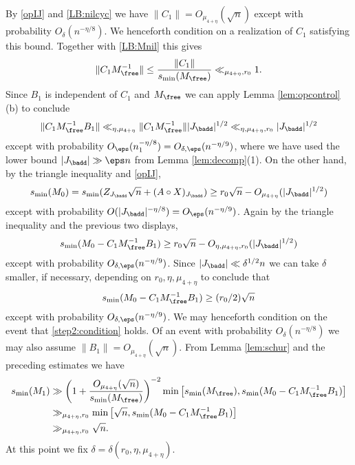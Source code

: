 \documentclass[aop,preprint]{imsart}
\theoremstyle{plain}
\theoremstyle{definition}
\theoremstyle{remark}
\numberwithin{equation}{section}
\numberwithin{theorem}{section}
\begin{document}
By \eqref{opIJ} and \eqref{LB:nilcyc} we have $\|C_1\|=O_{\mu_{4+\eta}}(\sqrt{n})$ except with probability $O_\delta(n^{-\eta/8})$. We henceforth condition on a realization of $C_1$ satisfying this bound.
Together with \eqref{LB:Mnil} this gives
\begin{equation}
\|C_1M_{\free}^{-1}\| \le \frac{\|C_1\|}{s_{\min}(M_{\free})} \ll_{\mu_{4+\eta},r_0}1.
\end{equation}
Since $B_1$ is independent of $C_1$ and $M_{\free}$ we can apply 
Lemma \ref{lem:opcontrol}(b)
%
to conclude
\begin{equation}	\label{C1MB1}
\|C_1M_{\free}^{-1}B_1\| \ll_{\eta,\mu_{4+\eta}}\|C_1M_{\free}^{-1}\| |J_{\badd}|^{1/2} \ll_{\eta,\mu_{4+\eta},r_0} |J_{\badd}|^{1/2}
\end{equation}
except with probability 
$O_{\eps}(n_1^{-\eta/8}) = O_{\delta,\eps}(n^{-\eta/9})$, 
where we have used the lower bound $|J_{\badd}|\gg \eps n$ from Lemma \ref{lem:decomp}(1).
On the other hand, by the triangle inequality and \eqref{opIJ},
\begin{equation}	\label{step2:M0}
s_{\min}(M_0) = s_{\min}(Z_{J_{\badd}} \sqrt{n} + (A\circ X)_{J_{\badd}}) \ge r_0\sqrt{n} - O_{\mu_{4+\eta}}(|J_{\badd}|^{1/2})
\end{equation}
except with probability $O(|J_{\badd}|^{-\eta/8}) = O_\eps(n^{-\eta/9})$. 
Again by the triangle inequality and the previous two displays, 
\begin{equation}
s_{\min}(M_0-C_1M_{\free}^{-1} B_1) \ge r_0\sqrt{n} - O_{\eta,\mu_{4+\eta},r_0}(|J_{\badd}|^{1/2})
\end{equation}
except with probability $O_{\delta,\eps}(n^{-\eta/9})$. 	
Since $|J_{\badd}|\ll \delta^{1/2}n$ we can take $\delta$ smaller, if necessary, depending on $r_0,\eta,\mu_{4+\eta}$ to conclude that
\begin{equation}	\label{step2:condition}
s_{\min}(M_0-C_1M_{\free}^{-1} B_1)\ge (r_0/2) \sqrt{n}
\end{equation}
except with probability $O_{\delta,\eps}(n^{-\eta/9})$. 
We may henceforth condition on the event that \eqref{step2:condition} holds. 
Of an event with probability $O_\delta(n^{-\eta/8})$ we may also assume $\|B_1\|=O_{\mu_{4+\eta}}(\sqrt{n})$.
From Lemma \ref{lem:schur} and the preceding estimates we have
\begin{align}
s_{\min}(M_1) 
&\gg \left( 1+ \frac{O_{\mu_{4+\eta}}(\sqrt{n})}{s_{\min}(M_{\free})}\right)^{-2} 
\min\big[ s_{\min}(M_{\free}), s_{\min}(M_0- C_1 M_{\free}^{-1} B_1)\big]	\notag\\
&\gg_{\mu_{4+\eta},r_0}\min\big[ \sqrt{n}, s_{\min}(M_0-C_1M_{\free}^{-1}B_1)\big]	\notag\\
&\gg_{\mu_{4+\eta},r_0} \sqrt{n}.	\label{step2:final}
\end{align}
At this point we fix $\delta=\delta(r_0, \eta,\mu_{4+\eta})$.
\end{document}
